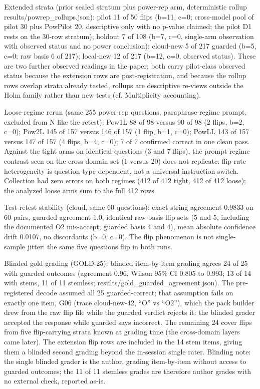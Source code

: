 \documentclass[10pt]{article} %
\begin{document}
Extended strata (prior sealed stratum plus power-rep arm, deterministic rollup results/powrep\_rollups.json): pilot 11 of 50 flips (b=11, c=0; cross-model pool of pilot 30 plus PowPilot 20, descriptive only with no p-value claimed; the pilot D1 rests on the 30-row stratum); holdout 7 of 108 (b=7, c=0, single-arm observation with observed status and no power conclusion); cloud-new 5 of 217 guarded (b=5, c=0; raw basis 6 of 217); local-new 12 of 217 (b=12, c=0, observed status). These are two further observed readings in the paper; both carry pilot-class observed status because the extension rows are post-registration, and because the rollup rows overlap strata already tested, rollups are descriptive re-views outside the Holm family rather than new tests (cf. Multiplicity accounting).

Loose-regime rerun (same 255 power-rep questions, paraphrase-regime prompt, excluded from N like the retest): Pow1L 88 of 98 versus 90 of 98 (2 flips, b=2, c=0); Pow2L 145 of 157 versus 146 of 157 (1 flip, b=1, c=0); PowLL 143 of 157 versus 147 of 157 (4 flips, b=4, c=0); 7 of 7 confirmed correct in one clean pass. Against the tight arms on identical questions (3 and 7 flips), the prompt-regime contrast seen on the cross-domain set (1 versus 20) does not replicate: flip-rate heterogeneity is question-type-dependent, not a universal instruction switch. Collection had zero errors on both regimes (412 of 412 tight, 412 of 412 loose); the analyzed loose arms sum to the full 412 rows.

Test-retest stability (cloud, same 60 questions): exact-string agreement 0.9833 on 60 pairs, guarded agreement 1.0, identical raw-basis flip sets (5 and 5, including the documented O2 mis-accept; guarded basis 4 and 4), mean absolute confidence drift 0.0107, no discordants (b=0, c=0). The flip phenomenon is not single-sample jitter: the same five questions flip in both runs.

Blinded gold grading (GOLD-25): blinded item-by-item grading agrees 24 of 25 with guarded outcomes (agreement 0.96, Wilson 95\% CI 0.805 to 0.993; 13 of 14 with stems, 11 of 11 stemless; results/gold\_guarded\_agreement.json). The pre-registered decode assumed all 25 guarded-correct; that assumption fails on exactly one item, G06 (trace cloud-new-42, ``O'' vs ``O2''), which the pack builder drew from the raw flip file while the guarded verdict rejects it: the blinded grader accepted the response while guarded says incorrect. The remaining 24 cover flips from five flip-carrying strata known at grading time (the cross-domain layers came later). The extension flip rows are included in the 14 stem items, giving them a blinded second grading beyond the in-session single rater. Blinding note: the single blinded grader is the author, grading item-by-item without access to guarded outcomes; the 11 of 11 stemless grades are therefore author grades with no external check, reported as-is.
\end{document}
